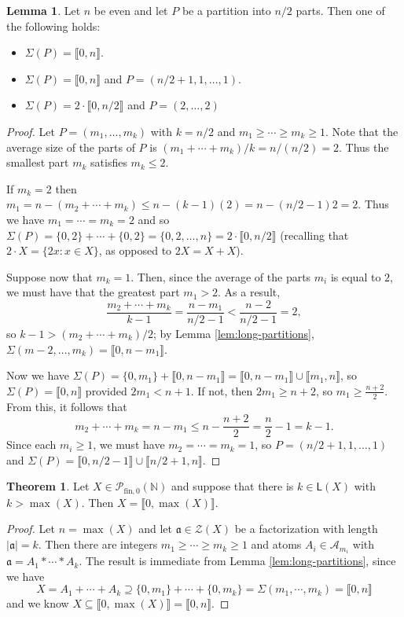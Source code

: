 \documentclass{report}
\newcommand{\A}{\mathscr{A}}
\renewcommand{\aa}{\mathfrak{a}}
\newcommand{\NN}{\mathbb{N}}
\renewcommand{\P}{\mathcal{P}}
\newcommand{\Z}{\mathcal{Z}}
\newcommand{\llb}{\llbracket}
\newcommand{\rrb}{\rrbracket}
\newcommand{\fin}{\textrm{fin}}
\renewcommand{\:}{\text{:}}
\newcommand{\PN}{{\P_{\fin,0}(\NN)}}
\theoremstyle{definition}
\newtheorem{lemma}[defn]{Lemma}
\newtheorem{thm}[defn]{Theorem}
\begin{document}
\begin{lemma} \label{lem:n/2-partitions}
Let $n$ be even and let $P$ be a partition into $n/2$ parts.
Then one of the following holds:
\begin{itemize}
	\item $\Sigma(P) = \llb 0, n \rrb$.
	\item $\Sigma(P) = \llb 0,n \rrb$ and $P = (n/2+1,1,\dots,1)$.
	\item $\Sigma(P) = 2\cdot \llb 0, n/2 \rrb$ and $P = (2,\dots, 2)$
\end{itemize}
\end{lemma}

\begin{proof}
Let $P = (m_1,\dots, m_k)$ with $k=n/2$ and $m_1\ge \cdots \ge m_k \ge 1$.
Note that the average size of the parts of $P$ is $(m_1+\cdots+m_k)/k = n/(n/2) = 2$.
Thus the smallest part $m_k$ satisfies $m_k \le 2$.

If $m_k = 2$ then $m_1 = n - (m_2+\cdots+m_k) \le n - (k-1)(2) = n - (n/2-1)2 = 2$.
Thus we have $m_1 = \cdots = m_k = 2$ and so $\Sigma(P) = \{0,2\}+\cdots+\{0,2\} = \{0,2,\dots,n\} = 2\cdot\llb0,n/2\rrb$ (recalling that $2\cdot X = \{2x: x\in X\}$, as opposed to $2X = X+X$).

Suppose now that $m_k=1$.
Then, since the average of the parts $m_i$ is equal to $2$, we must have that the greatest part $m_1 > 2$.
As a result, 
\[\frac{m_2+\cdots+m_k}{k-1} = \frac{n-m_1}{n/2-1} < \frac{n-2}{n/2-1} = 2, \]
so $k-1 > (m_2 + \cdots + m_k)/2$; by Lemma \ref{lem:long-partitions}, $\Sigma(m-2,\dots,m_k) = \llb 0, n-m_1 \rrb$.

Now we have $\Sigma(P) = \{0,m_1\} + \llb 0,n-m_1\rrb = \llb 0,n-m_1 \rrb \cup \llb m_1, n\rrb$, so $\Sigma(P) = \llb 0,n \rrb$ provided $2m_1 < n+1$.
If not, then $2m_1 \ge n+2$, so $m_1 \ge \frac{n+2}{2}$.
From this, it follows that 
\[m_2 +\cdots+m_k = n-m_1 \le n - \frac{n+2}{2} = \frac{n}{2}-1 = k-1.\]
Since each $m_i \ge 1$, we must have $m_2 = \cdots = m_k = 1$, so $P = (n/2+1, 1,\dots, 1)$ and $\Sigma(P) = \llb 0,n/2-1 \rrb \cup \llb n/2+1,n\rrb$.
\end{proof}

\begin{thm}
Let $X \in \PN$ and suppose that there is $k\in \mathsf{L}(X)$ with $k > \max(X)$.
Then $X = \llb 0, \max(X) \rrb$.
\end{thm}

\begin{proof}
Let $n = \max(X)$ and let $\aa\in\Z(X)$ be a factorization with length $|\aa| = k$.
Then there are integers $m_1\ge\cdots \ge m_k \ge 1$ and atoms $A_i\in \A_{m_i}$ with $\aa = A_1*\cdots*A_k$.
The result is immediate from Lemma \ref{lem:long-partitions}, since we have
\[ X = A_1 + \cdots + A_k \supseteq \{0,m_1\} + \cdots + \{0,m_k\} = \Sigma(m_1,\cdots,m_k) = \llb 0,n \rrb \]
and we know $X \subseteq \llb 0,\max(X) \rrb = \llb 0, n \rrb$.
\end{proof}
\end{document}
